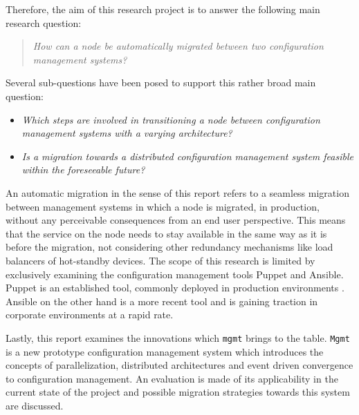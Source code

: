 Therefore, the aim of this research project is to answer the following main research question:

\begin{quote}
\textit{How can a node be automatically migrated between two configuration management systems?}
\end{quote}

\noindent
Several sub-questions have been posed to support this rather broad main question:

\begin{itemize}
	\setlength\itemsep{1pt}
    \item \textit{Which steps are involved in transitioning a node between configuration management systems with a varying architecture?}
    \item \textit{Is a migration towards a distributed configuration management system feasible within the foreseeable future?}
\end{itemize}

\noindent
An automatic migration in the sense of this report refers to a seamless migration between management systems in which a node is migrated, in production, without any perceivable consequences from an end user perspective. This means that the service on the node needs to stay available in the same way as it is before the migration, not considering other redundancy mechanisms like load balancers of hot-standby devices. The scope of this research is limited by exclusively examining the configuration management tools Puppet and Ansible. Puppet is an established tool, commonly deployed in production environments \cite{tecosystems_2013}. Ansible on the other hand is a more recent tool and is gaining traction in corporate environments at a rapid rate.

Lastly, this report examines the innovations which \texttt{mgmt} brings to the table. \texttt{Mgmt} is a new prototype configuration management system which introduces the concepts of parallelization, distributed architectures and event driven convergence to configuration management. An evaluation is made of its applicability in the current state of the project and possible migration strategies towards this system are discussed.
